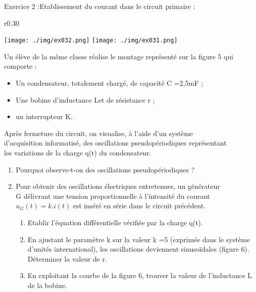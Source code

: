 \documentclass[12pt, french]{article}
\begin{document}
\begin{Box2}{Exercice 2 :Etablissement du courant dans le circuit primaire :  }
	\begin{wrapfigure}[0]{r}{0.30\textwidth}
  \begin{center}
	  \vspace{-0.6cm}
	\texttt{[image: ./img/ex032.png]}
	\texttt{[image: ./img/ex031.png]}
  \end{center}
\end{wrapfigure}
Un élève de la même classe réalise le montage représenté sur la figure 5 qui\\ comporte :
\begin{itemize}
\item Un condensateur, totalement chargé, de capacité C =2,5mF ;
\item Une bobine d’inductance Let de résistance r ;
\item  un interrupteur K.

\end{itemize}
	Après fermeture du circuit, on visualise, à l'aide d'un
système \\d’acquisition informatisé, des oscillations
pseudopériodiques représentant\\ les variations de la
charge q(t) du condensateur.

\begin{enumerate}
\item Pourquoi observe-t-on des oscillations
pseudopériodiques ?
\item Pour obtenir des oscillations électriques entretenues, un
générateur\\ G délivrant une tension proportionnelle à l’intensité du courant\\ $u_G(t)=k.i(t)$ est inséré en série
dans le circuit précédent.
\begin{enumerate}

\item  Etablir l’équation différentielle vérifiée par la charge q(t).
\item En ajustant le paramètre k sur la valeur k =5 (exprimée dans le système d’unités international), les
oscillations deviennent sinusoïdales (figure 6). Déterminer la valeur de r.
\item En exploitant la courbe de la figure 6, trouver la valeur de l’inductance L de la bobine.

\end{enumerate}

\end{enumerate}
\begin{center}
\end{center}

\end{Box2}
\end{document}
